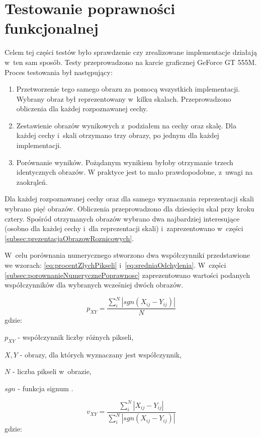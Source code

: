 \section{Testowanie poprawności funkcjonalnej}
\label{sec:testPoprawnosc}

Celem tej części testów było sprawdzenie czy zrealizowane implementacje działają w~ten sam sposób. Testy przeprowadzono na karcie graficznej GeForce GT 555M. Proces testowania był następujący:

\begin{enumerate}
\item Przetworzenie tego samego obrazu za pomocą wszystkich implementacji. Wybrany obraz był reprezentowany w~kilku skalach. Przeprowadzono obliczenia dla każdej rozpoznawanej cechy.
\item Zestawienie obrazów wynikowych z~podziałem na cechy oraz skalę. Dla każdej cechy i~skali otrzymano trzy obrazy, po jednym dla każdej implementacji.
\item Porównanie wyników. Pożądanym wynikiem byłoby otrzymanie trzech identycznych obrazów. W praktyce jest to mało prawdopodobne, z~uwagi na zaokrąleń.
\end{enumerate}

Dla każdej rozpoznawanej cechy oraz dla samego wyznaczania reprezentacji skali wybrano pięć obrazów. Obliczenia przeprowadzono dla dziesięciu skal przy kroku cztery. Spośród otrzymanych obrazów wybrano dwa najbardziej interesujące (osobno dla każdej cechy i~dla reprezentacji skali) i~zaprezentowano w~części \ref{subsec:prezentacjaObrazowRoznicowych}.

W~celu porównania numerycznego stworzono dwa współczynniki przedstawione we wzorach: \eqref{eq:procentZlychPikseli} i~\eqref{eq:sredniaOdchylenia}. W~części \ref{subsec:porownanieNumerycznePoprawnosc} zaprezentowano wartości podanych współczynników dla wybranych wcześniej dwóch obrazów.

\begin{equation}
\label{eq:procentZlychPikseli}
p_{XY} = \frac{\sum_{i}^{N}|sgn(X_{ij}-Y_{ij})	|}{N}
\end{equation}
gdzie:

$ p_{XY} $ - współczynnik liczby różnych pikseli,

$ X, Y $ - obrazy, dla których wyznaczany jest współczynnik,

$ N $ - liczba pikseli w~obrazie,

$ sgn $ - funkcja signum \cite{Signum}.

\begin{equation}
\label{eq:sredniaOdchylenia}
v_{XY} = \frac{\sum_{i}^{N}|X_{ij}-Y_{ij}|}{\sum_{i}^{N}|sgn(X_{ij}-Y_{ij})|}
\end{equation}
gdzie:


